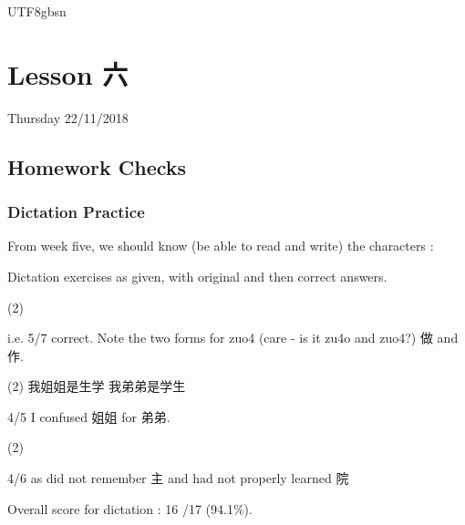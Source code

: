 \documentclass{article}
\newcommand{\myfont}{gbsn} %
\begin{document}
 
\begin{CJK}{UTF8}{\myfont} 
\section{Lesson 六}

Thursday 22/11/2018

\subsection{Homework Checks}

\subsubsection{Dictation Practice}

From week five, we should know (be able to read and write) the characters :

Dictation exercises as given, with original and then correct answers.

\begin{question}
  \begin{tasks}(2)
  \end{tasks}
\end{question}

i.e. 5/7 correct.  Note the two forms for zuo4 (care - is it zu4o and zuo4?) 做 and 作.

\begin{question}
  \begin{tasks}(2)
    \task 我姐姐是生学
    \task 我弟弟是学生
  \end{tasks}
\end{question}

4/5 I confused 姐姐 for 弟弟.

\begin{question}

  \begin{tasks}(2)
  \end{tasks}
\end{question}

4/6 as did not remember 主 and had not properly learned 院

Overall score for dictation : 16 /17 (94.1\%).


\end{CJK}
\end{document}
